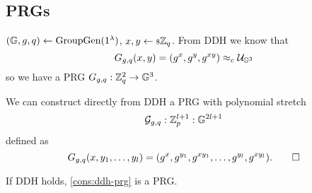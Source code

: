 \subsection{\aclp{PRG}}

$(\mathbb{G} , \allowbreak g , \allowbreak q) \leftarrow \mathrm{GroupGen}(1^{\lambda})$, $x,y \leftarrow {\scriptstyle \$} {\mathbb{Z}_q}$.
From \ac{DDH} we know that
\begin{equation*}
	G_{g,q}(x,y) = (g^x, g^y, g^{xy}) \approx_c \mathcal{U}_{\mathbb{G}^3}
\end{equation*}
so we have a \ac{PRG} $G_{g,q} : \mathbb{Z}_q^2 \to \mathbb{G}^3$.

\begin{construction} \label{cons:ddh-prg}
	We can construct directly from \ac{DDH} a \ac{PRG} with polynomial stretch
	\begin{equation*}
		\mathcal{G}_{g,q} : \mathbb{Z}_p^{l+1} : \mathbb{G}^{2l+1}
	\end{equation*}
	defined as
	\begin{equation*}
		G_{g,q}(x, y_1, \dots, y_l) = 
		(g^{x}, g^{y_1}, g^{x y_1}, \dots, g^{y_l}, g^{x y_l}). \qedhere
	\end{equation*}
\end{construction}

\begin{theorem} \label{thm:ddh-prg}
	If \ac{DDH} holds, \cref{cons:ddh-prg} is a \ac{PRG}.
\end{theorem}

